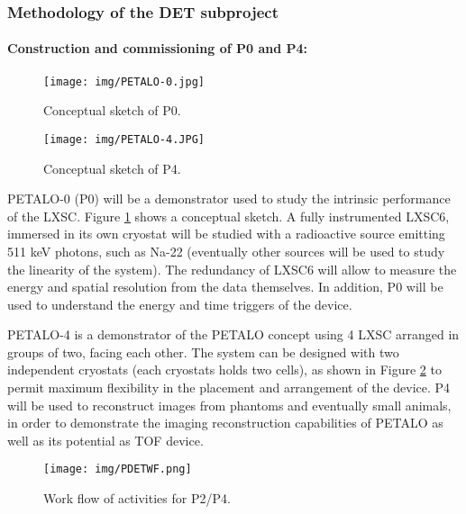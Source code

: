 \subsubsection*{Methodology of the DET subproject}

\paragraph{Construction and commissioning of P0 and P4:}

\begin{figure}[!htb]
	\centering
	\texttt{[image: img/PETALO-0.jpg]}
	\caption{\label{fig.P0} Conceptual sketch of P0.  }
\end{figure}

\begin{figure}[!htb]
	\centering
	\texttt{[image: img/PETALO-4.JPG]}
	\caption{\label{fig.P2} Conceptual sketch of P4. }
\end{figure}

PETALO-0 (P0) will be a demonstrator used to study the intrinsic performance of the LXSC. Figure \ref{fig.P0} shows a conceptual sketch. A fully instrumented LXSC6, immersed in its own cryostat will be studied with a radioactive source emitting 511 keV photons, such as Na-22 (eventually other sources will be used to study the linearity of the system). The redundancy of LXSC6 will allow to measure the energy and spatial resolution from the data themselves. In addition, P0 will be used to understand the energy and time triggers of the device. 

PETALO-4 is a demonstrator of the PETALO concept using 4 LXSC arranged in groups of two, facing each other. The system can be designed with two independent cryostats (each cryostats holds two cells), as shown in Figure \ref{fig.P2} to permit maximum flexibility in the placement and arrangement of the device. P4 will be used to reconstruct images from phantoms and eventually small animals, in order to demonstrate the imaging reconstruction capabilities of PETALO as well as its potential as TOF device. 


\begin{figure}[!htb]
	\centering
	\texttt{[image: img/PDETWF.png]}
	\caption{\label{fig.P2WF} Work flow of activities for P2/P4.  }
\end{figure}

